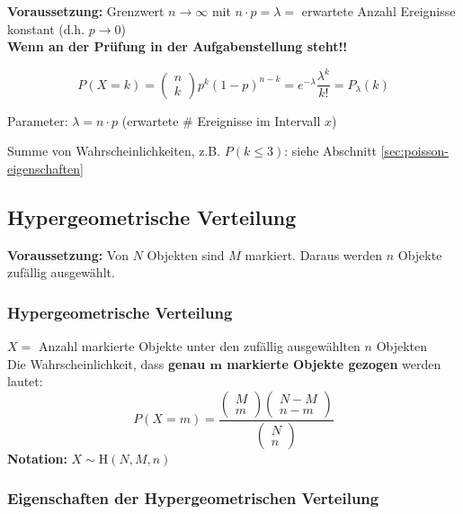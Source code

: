 \textbf{Voraussetzung:} Grenzwert $n \to \infty$ mit $n \cdot p = \lambda = $ erwartete Anzahl Ereignisse konstant (d.h. $p \to 0$) \\
\textbf{Wenn an der Prüfung  in der Aufgabenstellung steht!!}

$$ \boxed{ P(X = k) = \begin{pmatrix} n \\ k \end{pmatrix} p^k (1-p)^{n-k} = e^{- \lambda} \frac{\lambda^k}{k!} = P_{\lambda}(k) } $$

Parameter: $\lambda = n \cdot p$ \quad (erwartete \# Ereignisse im Intervall $x$)

\vspace{0.2cm}

Summe von Wahrscheinlichkeiten, z.B. $P(k \leq 3)$: siehe Abschnitt \ref{sec:poisson-eigenschaften}


\subsection{Hypergeometrische Verteilung}

\textbf{Voraussetzung:} Von $N$ Objekten sind $M$ markiert. Daraus werden $n$ Objekte zufällig ausgewählt.


\subsubsection{Hypergeometrische Verteilung}

$X = $ Anzahl markierte Objekte unter den zufällig ausgewählten $n$ Objekten \\
Die Wahrscheinlichkeit, dass \textbf{genau $\boldsymbol{m}$ markierte Objekte gezogen} werden lautet:
$$ \boxed{ P(X = m) = \frac{ \begin{pmatrix} M \\ m \end{pmatrix} \begin{pmatrix} N-M \\ n-m \end{pmatrix} }{\begin{pmatrix} N \\ n \end{pmatrix}} } $$
\textbf{Notation: } $X \sim \mathrm{H}(N, M, n) $


\subsubsection{Eigenschaften der Hypergeometrischen Verteilung}

